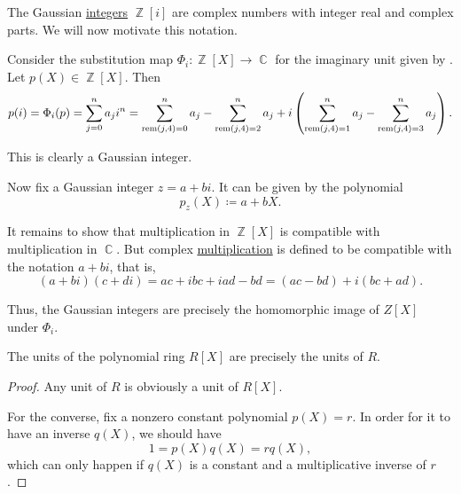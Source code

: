 \begin{example}\label{ex:polynomial_evaluation_gaussian_integers}
  The Gaussian \hyperref[def:gaussian_integers]{integers} \( \BbbZ[i] \) are complex numbers with integer real and complex parts. We will now motivate this notation.

  Consider the substitution map \( \Phi_i: \BbbZ[X] \to \BbbC \) for the imaginary unit given by . Let \( p(X) \in \BbbZ[X] \). Then
  \begin{equation*}
    p(i)
    =
    \Phi_i(p)
    =
    \sum_{j=0}^n a_j i^n
    =
    \sum_{\operatorname{rem}(j, 4) = 0}^n a_j - \sum_{\operatorname{rem}(j, 4) = 2}^n a_j + i \left(\sum_{\operatorname{rem}(j, 4) = 1}^n a_j - \sum_{\operatorname{rem}(j, 4) = 3}^n a_j \right).
  \end{equation*}

  This is clearly a Gaussian integer.

  Now fix a Gaussian integer \( z = a + bi \). It can be given by the polynomial
  \begin{equation*}
    p_z(X) \coloneqq a + bX.
  \end{equation*}

  It remains to show that multiplication in \( \BbbZ[X] \) is compatible with multiplication in \( \BbbC \). But complex \hyperref[def:complex_numbers]{multiplication} is defined to be compatible with the notation \( a + bi \), that is,
  \begin{equation*}
    (a + bi) (c + di)
    =
    ac + ibc + iad - bd
    =
    (ac - bd) + i(bc + ad).
  \end{equation*}

  Thus, the Gaussian integers are precisely the homomorphic image of \( Z[X] \) under \( \Phi_i \).
\end{example}

\begin{proposition}\label{thm:polynomial_ring_units}
  The units of the polynomial ring \( R[X] \) are precisely the units of \( R \).
\end{proposition}
\begin{proof}
  Any unit of \( R \) is obviously a unit of \( R[X] \).

  For the converse, fix a nonzero constant polynomial \( p(X) = r \). In order for it to have an inverse \( q(X) \), we should have
  \begin{equation*}
    1 = p(X) q(X) = r q(X),
  \end{equation*}
  which can only happen if \( q(X) \) is a constant and a multiplicative inverse of \( r \).
\end{proof}

